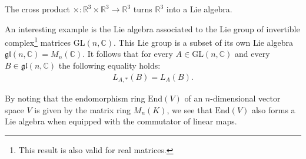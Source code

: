     \begin{example}
        The cross product $\times:\mathbb{R}^3\times\mathbb{R}^3\rightarrow\mathbb{R}^3$ turns $\mathbb{R}^3$ into a Lie algebra.
    \end{example}
    \begin{example}
        An interesting example is the Lie algebra associated to the Lie group of invertible complex\footnote{This result is also valid for real matrices.} matrices $\text{GL}(n, \mathbb{C})$. This Lie group is a subset of its own Lie algebra $\mathfrak{gl}(n, \mathbb{C}) = M_n(\mathbb{C})$. It follows that for every $A\in\text{GL}(n, \mathbb{C})$ and every $B\in\mathfrak{gl}(n, \mathbb{C})$ the following equality holds:
        \begin{gather}
            L_{A,*}(B)=L_A(B).
        \end{gather}
    \end{example}
    \begin{result}\label{lie:end_as_lie_algebra}
        By noting that the endomorphism ring $\text{End}(V)$ of an $n$-dimensional vector space $V$ is given by the matrix ring $M_n(K)$, we see that $\text{End}(V)$ also forms a Lie algebra when equipped with the commutator of linear maps.
    \end{result}

